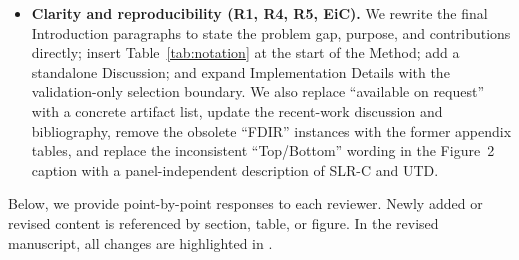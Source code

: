 \begin{itemize}
\item \textbf{Clarity and reproducibility (R1, R4, R5, EiC).} We rewrite the final Introduction paragraphs to state the problem gap, purpose, and contributions directly; insert Table~\ref{tab:notation} at the start of the Method; add a standalone Discussion; and expand Implementation Details with the validation-only selection boundary. We also replace ``available on request'' with a concrete artifact list, update the recent-work discussion and bibliography, remove the obsolete ``FDIR'' instances with the former appendix tables, and replace the inconsistent ``Top/Bottom'' wording in the Figure~2 caption with a panel-independent description of SLR-C and UTD.
\end{itemize}

Below, we provide point-by-point responses to each reviewer. Newly added or revised content is referenced by section, table, or figure. In the revised manuscript, all changes are highlighted in .
